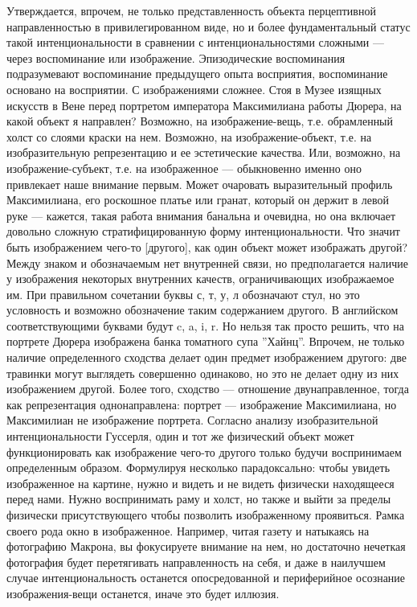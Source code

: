 \documentclass[11pt]{book}
\begin{document}
Утверждается, впрочем, не только представленность объекта перцептивной направленностью в привилегированном виде, но и более фундаментальный статус такой интенциональности в сравнении с интенциональностями сложными --- через воспоминание или изображение. Эпизодические воспоминания подразумевают воспоминание предыдущего опыта восприятия, воспоминание основано на восприятии. С изображениями сложнее. Стоя в Музее изящных искусств в Вене перед портретом императора Максимилиана работы Дюрера, на какой объект я направлен? Возможно, на изображение-вещь, т.е. обрамленный холст со слоями краски на нем. Возможно, на изображение-объект, т.е. на изобразительную репрезентацию и ее эстетические качества. Или, возможно, на изображение-субъект, т.е. на изображенное --- обыкновенно именно оно привлекает наше внимание первым. Может очаровать выразительный профиль Максимилиана, его роскошное платье или гранат, который он держит в левой руке --- кажется, такая работа внимания банальна и очевидна, но она включает довольно сложную стратифицированную форму интенциональности. Что значит быть изображением чего-то [другого], как один объект может изображать другой? Между знаком и обозначаемым нет внутренней связи, но предполагается наличие у изображения некоторых внутренних качеств, ограничивающих изображаемое им. При правильном сочетании буквы с, т, у, л обозначают стул, но это условность и возможно обозначение таким содержанием другого. В английском соответствующими буквами будут c, a, i, r. Но нельзя так просто решить, что на портрете Дюрера изображена банка томатного супа ''Хайнц''. Впрочем, не только наличие определенного сходства делает один предмет изображением другого: две травинки могут выглядеть совершенно одинаково, но это не делает одну из них изображением другой. Более того, сходство --- отношение двунаправленное, тогда как репрезентация однонаправлена: портрет --- изображение Максимилиана, но Максимилиан не изображение портрета. Согласно анализу изобразительной интенциональности Гуссерля, один и тот же физический объект может функционировать как изображение чего-то другого только будучи воспринимаем определенным образом. Формулируя несколько парадоксально: чтобы увидеть изображенное на картине, нужно и видеть и не видеть физически находящееся перед нами. Нужно воспринимать раму и холст, но также и выйти за пределы физически присутствующего чтобы позволить изображенному проявиться. Рамка своего рода окно в изображенное. Например, читая газету и натыкаясь на фотографию Макрона, вы фокусируете внимание на нем, но достаточно нечеткая фотография будет перетягивать направленность на себя, и даже в наилучшем случае интенциональность останется опосредованной и периферийное осознание изображения-вещи останется, иначе это будет иллюзия.
\end{document}
